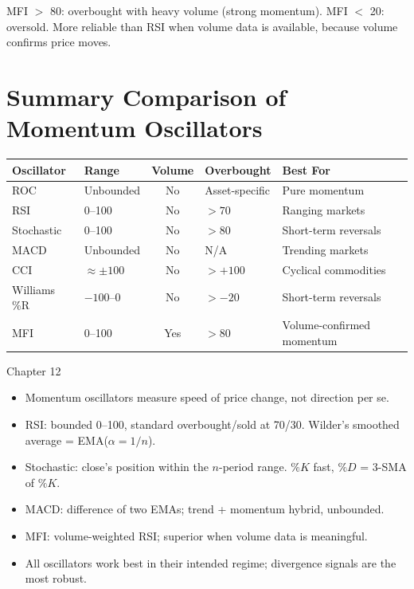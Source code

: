 \documentclass[12pt,a4paper,openany]{report}
\theoremstyle{definition}
\begin{document}
MFI $>$ 80: overbought with heavy volume (strong momentum). MFI $<$ 20: oversold. More reliable than RSI when volume data is available, because volume confirms price moves.

\section{Summary Comparison of Momentum Oscillators}

\begin{center}
\begin{tabular}{llcll}
\toprule
\textbf{Oscillator} & \textbf{Range} & \textbf{Volume} & \textbf{Overbought} & \textbf{Best For} \\
\midrule
ROC         & Unbounded & No  & Asset-specific & Pure momentum \\
RSI         & 0--100    & No  & $>70$          & Ranging markets \\
Stochastic  & 0--100    & No  & $>80$          & Short-term reversals \\
MACD        & Unbounded & No  & N/A            & Trending markets \\
CCI         & $\approx\pm100$ & No & $>+100$   & Cyclical commodities \\
Williams \%R & $-100$--$0$ & No & $>-20$        & Short-term reversals \\
MFI         & 0--100    & Yes & $>80$          & Volume-confirmed momentum \\
\bottomrule
\end{tabular}
\end{center}

\begin{takeawaybox}{Chapter 12}
\begin{itemize}
  \item Momentum oscillators measure speed of price change, not direction per se.
  \item RSI: bounded 0--100, standard overbought/sold at 70/30. Wilder's smoothed average = EMA($\alpha=1/n$).
  \item Stochastic: close's position within the $n$-period range. $\%K$ fast, $\%D$ = 3-SMA of $\%K$.
  \item MACD: difference of two EMAs; trend + momentum hybrid, unbounded.
  \item MFI: volume-weighted RSI; superior when volume data is meaningful.
  \item All oscillators work best in their intended regime; divergence signals are the most robust.
\end{itemize}
\end{takeawaybox}
\end{document}
